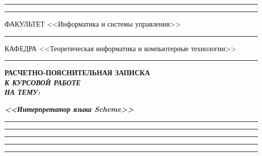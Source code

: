 \documentclass[14pt, russian]{scrartcl}
\begin{document}
\begin{titlepage}
\vspace{-2pt}
\hspace{-34.5pt}\rule{\textwidth}{2.5pt}

\vspace*{-20.3pt}
\hspace{-34.5pt}\rule{\textwidth}{0.4pt}
 
\vspace{0.5ex}
\noindent \small ФАКУЛЬТЕТ\hspace{80pt} <<Информатика и системы управления>>

\vspace*{-16pt}
\hspace{35pt}\rule{0.855\textwidth}{0.4pt}

\vspace{0.5ex}
\noindent \small КАФЕДРА\hspace{50pt} <<Теоретическая информатика и компьютерные технологии>>

\vspace*{-16pt}
\hspace{25pt}\rule{0.875\textwidth}{0.4pt}
 
 
\vspace{3em}
 
\begin{center}
\Large \bf{РАСЧЕТНО-ПОЯСНИТЕЛЬНАЯ ЗАПИСКА\\\textbf{\textit{К КУРСОВОЙ РАБОТЕ\\НА ТЕМУ:}} \\}
\end{center}

\vspace*{-6ex} 
\begin{center}
\Large{\textit{\textbf{<<Интерпретатор языка Scheme>>}}}

\vspace*{-3ex}
\rule{0.9\textwidth}{1.2pt}

\vspace*{-0.2ex}
\rule{0.9\textwidth}{1.2pt}

\vspace*{-0.2ex}
\rule{0.9\textwidth}{1.2pt}

\vspace*{-0.2ex}
\rule{0.9\textwidth}{1.2pt}

\vspace*{-0.2ex}
\rule{0.9\textwidth}{1.2pt}
\end{center}
 
\vspace{\fill}
 


\end{titlepage}
\end{document}
